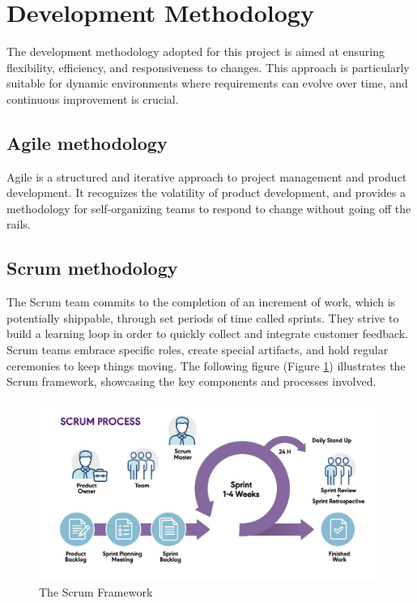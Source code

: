 \section{Development Methodology}
The development methodology adopted for this project is aimed at ensuring flexibility, efficiency, and responsiveness to changes. This approach is particularly suitable for dynamic environments where requirements can evolve over time, and continuous improvement is crucial.

\subsection{Agile methodology}
Agile is a structured and iterative approach to project management and product development.
It recognizes the volatility of product development, and provides a methodology for self-organizing teams to respond to change without going off the rails.

\subsection{Scrum methodology}
The Scrum team commits to the completion of an increment of work, which is potentially shippable, through set periods of time called sprints. They strive to build a learning loop in order to quickly collect and integrate customer feedback. Scrum teams embrace specific roles, create special artifacts, and hold regular ceremonies to keep things moving. The following figure (Figure \ref{fig:Scrum_Framework_image}) illustrates the Scrum framework, showcasing the key components and processes involved.

\begin{figure}[H]
    \centering
    \includegraphics[width=1\textwidth]{src/assets/chapters/blog-scrum-process-opt.jpg}
    \caption{The Scrum Framework}
    \label{fig:Scrum_Framework_image}
\end{figure}



